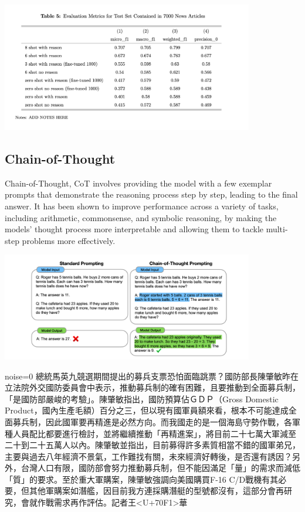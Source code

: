 \documentclass[11.5pt]{beamer}
\begin{document}
\begin{frame}
\includegraphics[width=11cm]{Figures/fig2.png}
\end{frame}


\subsection{Chain-of-Thought}
\begin{frame}{Chain-of-Thought, \cite{Wei2022}}
CoT involves providing the model with a few exemplar prompts that
demonstrate the reasoning process step by step, leading to the final answer.
It has been shown to improve performance across a variety of tasks,
including arithmetic, commonsense, and symbolic reasoning, by making the
models' thought process more interpretable and allowing them to tackle
multi-step problems more effectively.
\end{frame}


\begin{frame}
\includegraphics[width=11cm]{Figures/fig3.png}
\end{frame}

\begin{frame}{noise=0}
總統馬英九競選期間提出的募兵支票恐怕面臨跳票？國防部長陳肇敏昨在立法院外交國防委員會中表示，推動募兵制的確有困難，且要推動到全面募兵制，「是國防部嚴峻的考驗」。陳肇敏指出，國防預算佔ＧＤＰ（Gross Domestic Product，國內生產毛額）百分之三，但以現有國軍員額來看，根本不可能達成全面募兵制，因此國軍要再精進是必然方向。而我國走的是一個海島守勢作戰，各軍種人員配比都要進行檢討，並將繼續推動「再精進案」，將目前二十七萬大軍減至二十到二十五萬人以內。陳肇敏並指出，目前募得許多素質相當不錯的國軍弟兄，主要與過去八年經濟不景氣，工作難找有關，未來經濟好轉後，是否還有誘因？另外，台灣人口有限，國防部會努力推動募兵制，但不能因滿足「量」的需求而減低「質」的要求。至於重大軍購案，陳肇敏強調向美國購買F-16 C/D戰機有其必要，但其他軍購案如潛艦，因目前我方連採購潛艇的型號都沒有，這部分會再研究，會就作戰需求再作評估。記者王<U+70F1>華
\end{frame}
\end{document}
